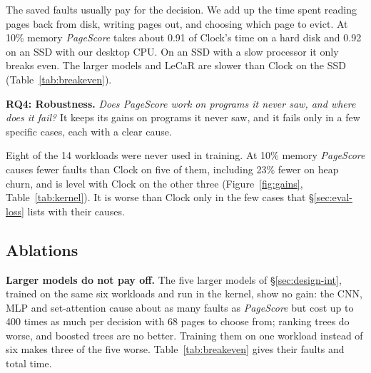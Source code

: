 \documentclass{article}
\newcommand{\figdata}{figures/data}
\newcommand{\clock}{Clock\xspace}
\DeclareRobustCommand{\pagescore}{\textit{PageScore}}
\newcommand{\finding}[1]{\textbf{#1}\hspace{0.4em}}
\newcommand{\rqbox}[3]{\par\smallskip\noindent\textbf{#1.} \emph{#2} #3\par}
\begin{document}
The saved faults usually pay for the decision. We add up the time spent reading pages back from disk, writing pages out, and choosing which page to evict. At 10\% memory \pagescore{} takes about 0.91 of \clock's time on a hard disk and 0.92 on an SSD with our desktop CPU. On an SSD with a slow processor it only breaks even. The larger models and LeCaR are slower than \clock on the SSD (Table~\ref{tab:breakeven}).

\begin{table}[t]
\caption{Total time relative to \clock at 10\% memory, averaged over the 14 workloads: reading pages back, writing evicted pages out, and choosing. Below 1 is faster than \clock (bold). Measured disks: SSD 63\,\textmu s per read and 22\,\textmu s per write, hard disk 8.9\,ms and 2.6\,ms. Choosing costs 1\,ns per instruction on a slow core and 0.047\,ns on our desktop core.}
\label{tab:breakeven}
\vskip 0.05in
\begin{center}
\end{center}
\end{table}

\rqbox{RQ4: Robustness}{Does \pagescore{} work on programs it never saw, and where does it fail?}{It keeps its gains on programs it never saw, and it fails only in a few specific cases, each with a clear cause.}\label{sec:eval-robust}

Eight of the 14 workloads were never used in training. At 10\% memory \pagescore{} causes fewer faults than \clock on five of them, including 23\% fewer on heap churn, and is level with \clock on the other three (Figure~\ref{fig:gains}, Table~\ref{tab:kernel}). It is worse than \clock only in the few cases that \S\ref{sec:eval-loss} lists with their causes.

\subsection{Ablations}
\label{sec:eval-ablate}

\finding{Larger models do not pay off.} The five larger models of \S\ref{sec:design-int}, trained on the same six workloads and run in the kernel, show no gain: the CNN, MLP and set-attention cause about as many faults as \pagescore{} but cost up to 400 times as much per decision with 68 pages to choose from; ranking trees do worse, and boosted trees are no better. Training them on one workload instead of six makes three of the five worse. Table~\ref{tab:breakeven} gives their faults and total time.
\end{document}
